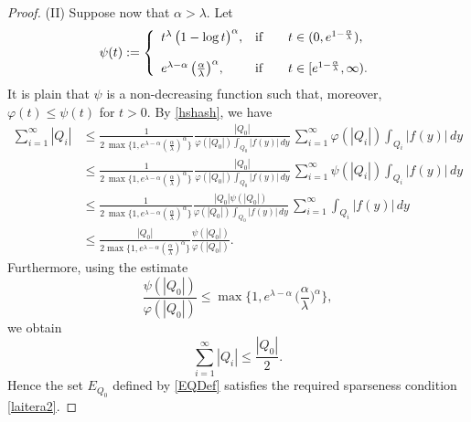 \documentclass[11pt, a4paper,leqno]{amsart}
\theoremstyle{plain}
\numberwithin{equation}{section}
\theoremstyle{definition}
\theoremstyle{remark}
\begin{document}
\begin{proof}
(II) Suppose now that $\alpha>\lambda$. Let
\[
\psi(t):=\left\{
\begin{array}
[c]{ll}%
t^{\lambda}\,\big(1-\log t\big)^{\alpha}, & \text{if}\qquad t\in
(0,e^{1-\frac{\alpha}{\lambda}}),\\
& \\
e^{\lambda-\alpha}\,\big(\frac{\alpha}{\lambda}\big)^{\alpha}, &
\text{if}\qquad t\in\lbrack e^{1-\frac{\alpha}{\lambda}},\infty).
\end{array}
\right.
\]
It is plain that $\psi$ is a non-decreasing function such that, moreover,
$\varphi(t)\leq\psi(t)$ for $t>0$. By \eqref{hshash}, we have
\begin{align*}
\sum_{i=1}^{\infty}|Q_{i}|  &  \leq\frac{1}{2\,\max\{1,e^{\lambda-\alpha
}(\frac{\alpha}{\lambda})^{\alpha}\}\,}\frac{|Q_{0}|}{\varphi(|Q_{0}%
|)\int_{Q_{0}}|f(y)|\,dy}\,\sum_{i=1}^{\infty}\varphi(|Q_{i}|)\int_{Q_{i}%
}|f(y)|\,dy\\
&  \leq\frac{1}{2\,\max\{1,e^{\lambda-\alpha}(\frac{\alpha}{\lambda})^{\alpha
}\}\,}\frac{|Q_{0}|}{\varphi(|Q_{0}|)\int_{Q_{0}}|f(y)|\,dy}\,\sum
_{i=1}^{\infty}\psi(|Q_{i}|)\int_{Q_{i}}|f(y)|\,dy\\
&  \leq\frac{1}{2\,\max\{1,e^{\lambda-\alpha}(\frac{\alpha}{\lambda})^{\alpha
}\}}\frac{|Q_{0}|\psi(|Q_{0}|)}{\varphi(|Q_{0}|)\int_{Q_{0}}|f(y)|\,dy}%
\,\sum_{i=1}^{\infty}\int_{Q_{i}}|f(y)|\,dy\\
&  \leq\frac{|Q_{0}|}{2\max\{1,e^{\lambda-\alpha}(\frac{\alpha}{\lambda
})^{\alpha}\}}\frac{\psi(|Q_{0}|)}{\varphi(|Q_{0}|)}.
\end{align*}
Furthermore, using the estimate
\[
\frac{\psi(|Q_{0}|)}{\varphi(|Q_{0}|)}\leq\max\bigg\{1,e^{\lambda-\alpha
}\,\bigg(\frac{\alpha}{\lambda}\bigg)^{\alpha}\bigg\},
\]
we obtain
\[
\sum_{i=1}^{\infty}|Q_{i}|\leq\frac{|Q_{0}|}{2}.
\]
Hence the set $E_{Q_{0}}$ defined by \eqref{EQDef} satisfies the required
sparseness condition \eqref{laitera2}.


\end{proof}
\end{document}
